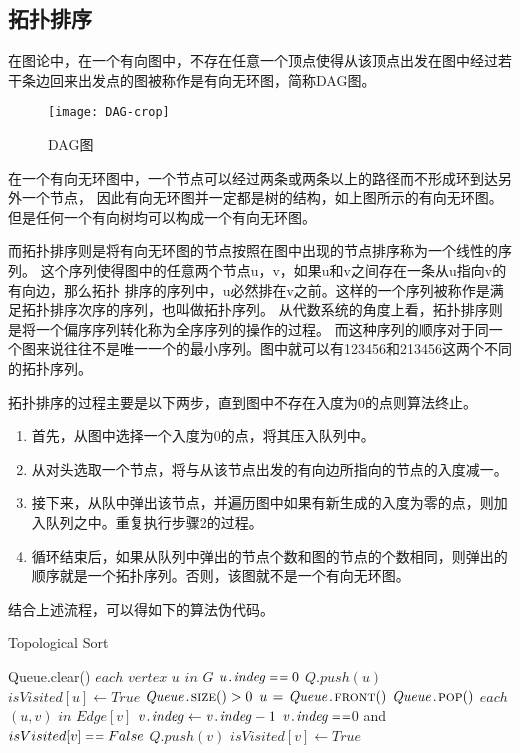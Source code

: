 \subsection{拓扑排序}
在图论中，在一个有向图中，不存在任意一个顶点使得从该顶点出发在图中经过若干条边回来出发点的图被称作是有向无环图，简称DAG图。
\begin{figure}[htbp]
\centering\texttt{[image: DAG-crop]}
\caption{DAG图}\label{fig:DAG}
\end{figure}
在一个有向无环图中，一个节点可以经过两条或两条以上的路径而不形成环到达另外一个节点，
因此有向无环图并一定都是树的结构，如上图所示的有向无环图。但是任何一个有向树均可以构成一个有向无环图。

而拓扑排序则是将有向无环图的节点按照在图中出现的节点排序称为一个线性的序列。
这个序列使得图中的任意两个节点u，v，如果u和v之间存在一条从u指向v的有向边，那么拓扑
排序的序列中，u必然排在v之前。这样的一个序列被称作是满足拓扑排序次序的序列，也叫做拓扑序列。
从代数系统的角度上看，拓扑排序则是将一个偏序序列转化称为全序序列的操作的过程。
而这种序列的顺序对于同一个图来说往往不是唯一一个的最小序列。图中就可以有123456和213456这两个不同的拓扑序列。

拓扑排序的过程主要是以下两步，直到图中不存在入度为0的点则算法终止。
\begin{enumerate}
\item 首先，从图中选择一个入度为0的点，将其压入队列中。
\item 从对头选取一个节点，将与从该节点出发的有向边所指向的节点的入度减一。
\item 接下来，从队中弹出该节点，并遍历图中如果有新生成的入度为零的点，则加入队列之中。重复执行步骤2的过程。
\item 循环结束后，如果从队列中弹出的节点个数和图的节点的个数相同，则弹出的顺序就是一个拓扑序列。否则，该图就不是一个有向无环图。
\end{enumerate}

结合上述流程，可以得如下的算法伪代码。
\begin{algorithm} 
\caption {Topological Sort} 
\begin{codebox}
\li Queue.clear()
\li \For $each$ $vertex $ $u$ $in$ $G$
\li	\Do \If $\attribii{u}{indeg}  \isequal 0$
\li		\Then	$Q.push(u)$	
\li				$isVisited[u] \leftarrow True$
		\End
	\End
\li \While $\attribii{Queue}{\proc{size}()} > 0$
\li	\Do	$u \gets \attribii{Queue}{\proc{front}()}$
\li		$\attribii{Queue}{\proc{pop}()}$
\li		\For $each$ $(u,v)$ $in$ $ Edge[v]$
\li			\Do	$ \attribii{v}{indeg} \leftarrow  \attribii{v}{indeg} - 1$
\li			\If $\attribii{v}{indeg}  \isequal $0 and $isVisited[v] \isequal False$
\li				\Then	$Q.push(v)$
\li						$isVisited[v] \leftarrow True$
				\End
	\End
   \End
\end{codebox}
\end{algorithm} 
